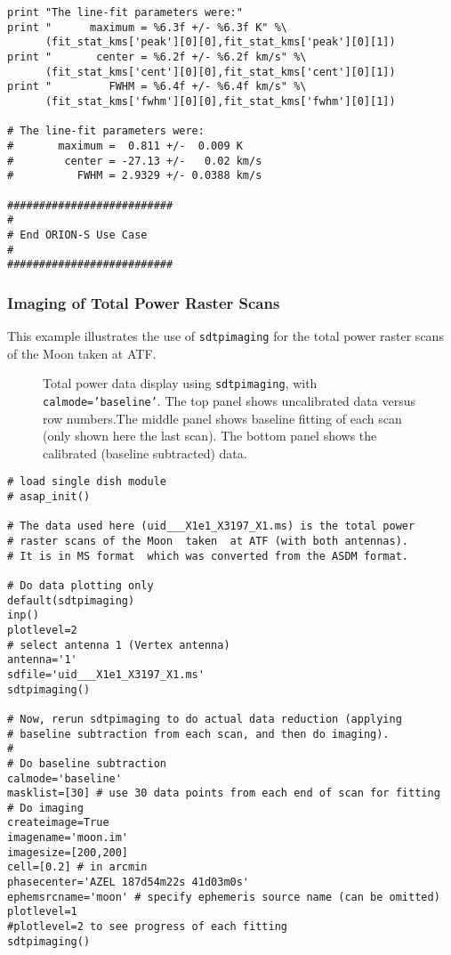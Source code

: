 \begin{verbatim}
print "The line-fit parameters were:"
print "      maximum = %6.3f +/- %6.3f K" %\
      (fit_stat_kms['peak'][0][0],fit_stat_kms['peak'][0][1])
print "       center = %6.2f +/- %6.2f km/s" %\
      (fit_stat_kms['cent'][0][0],fit_stat_kms['cent'][0][1])
print "         FWHM = %6.4f +/- %6.4f km/s" %\
      (fit_stat_kms['fwhm'][0][0],fit_stat_kms['fwhm'][0][1])

# The line-fit parameters were:
#       maximum =  0.811 +/-  0.009 K
#        center = -27.13 +/-   0.02 km/s
#          FWHM = 2.9329 +/- 0.0388 km/s

##########################
#
# End ORION-S Use Case
#
##########################
\end{verbatim}

\subsubsection{Imaging of Total Power Raster Scans}
This example illustrates the use of {\tt sdtpimaging} for the total
power raster scans of the Moon taken at ATF.
\begin{figure}[h!]
\begin{center}
\caption{\label{fig:sdtpimaging} Total power data display using {\tt sdtpimaging}, 
with {\tt calmode='baseline'}. The top  panel shows uncalibrated data versus row numbers.The middle panel shows baseline fitting of each scan (only shown here the last
scan). The bottom panel shows the calibrated (baseline subtracted) data. }
\hrulefill
\end{center}
\end{figure}

\begin{verbatim}
# load single dish module
# asap_init()

# The data used here (uid___X1e1_X3197_X1.ms) is the total power 
# raster scans of the Moon  taken  at ATF (with both antennas). 
# It is in MS format  which was converted from the ASDM format.

# Do data plotting only
default(sdtpimaging)
inp()
plotlevel=2
# select antenna 1 (Vertex antenna) 
antenna='1'
sdfile='uid___X1e1_X3197_X1.ms'
sdtpimaging()

# Now, rerun sdtpimaging to do actual data reduction (applying
# baseline subtraction from each scan, and then do imaging).
#
# Do baseline subtraction 
calmode='baseline'
masklist=[30] # use 30 data points from each end of scan for fitting
# Do imaging 
createimage=True
imagename='moon.im'
imagesize=[200,200]
cell=[0.2] # in arcmin
phasecenter='AZEL 187d54m22s 41d03m0s'  
ephemsrcname='moon' # specify ephemeris source name (can be omitted)
plotlevel=1
#plotlevel=2 to see progress of each fitting
sdtpimaging()
\end{verbatim}

